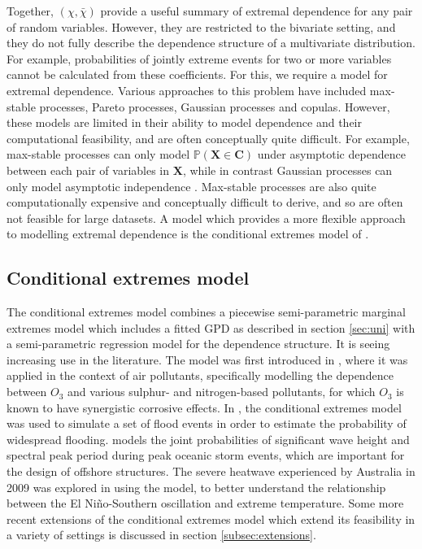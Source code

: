 \documentclass{article}
\numberwithin{equation}{section}
\begin{document}
Together, $(\chi, \bar{\chi})$ provide a useful summary of extremal dependence for any pair of random variables.
However, they are restricted to the bivariate setting, and they do not fully describe the dependence structure of a multivariate distribution.
For example, probabilities of jointly extreme events for two or more variables cannot be calculated from these coefficients.
For this, we require a model for extremal dependence.
Various approaches to this problem have included max-stable processes, Pareto processes, Gaussian processes and copulas.
However, these models are limited in their ability to model dependence and their computational feasibility, and are often conceptually quite difficult. 
For example, max-stable processes can only model $\mathbb{P}(\bm{X} \in \bm{C})$ under asymptotic dependence between each pair of variables in $\bm{X}$, while in contrast Gaussian processes can only model asymptotic independence \citep{Tawn2018, Huser2024}.
Max-stable processes are also quite computationally expensive and conceptually difficult to derive, and so are often not feasible for large datasets.
A model which provides a more flexible approach to modelling extremal dependence is the conditional extremes model of \cite{Heffernan2004}.


\subsection{Conditional extremes model}


The conditional extremes model combines a piecewise semi-parametric marginal extremes model which includes a fitted GPD as described in section \ref{sec:uni} with a semi-parametric regression model for the dependence structure. 
It is seeing increasing use in the literature.
The model was first introduced in \citep{Heffernan2004}, where it was applied in the context of air pollutants, specifically modelling the dependence between $O_3$ and various sulphur- and nitrogen-based pollutants, for which $O_3$ is known to have synergistic corrosive effects. 
In \citep{Keef2012_flooding}, the conditional extremes model was used to simulate a set of flood events in order to estimate the probability of widespread flooding. 
\citep{Jonathan2013} models the joint probabilities of significant wave height and spectral peak period during peak oceanic storm events, which are important for the design of offshore structures. 
The severe heatwave experienced by Australia in 2009 was explored in \citep{Winter2016} using the model, to better understand the relationship between the El Niño-Southern oscillation and extreme temperature.
Some more recent extensions of the conditional extremes model which extend its feasibility in a variety of settings is discussed in section \ref{subsec:extensions}.
\end{document}

